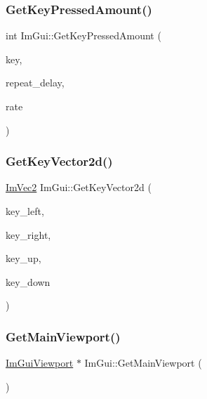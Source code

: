 \subsubsection{\texorpdfstring{Get\+Key\+Pressed\+Amount()}{GetKeyPressedAmount()}}
{\footnotesize\ttfamily int Im\+Gui\+::\+Get\+Key\+Pressed\+Amount (\begin{DoxyParamCaption}\item[{\hyperlink{imgui_8h_aa22ffe36b188427d712447ec465203d4}{Im\+Gui\+Key}}]{key,  }\item[{float}]{repeat\+\_\+delay,  }\item[{float}]{rate }\end{DoxyParamCaption})}

\mbox{\label{namespaceImGui_a521d0ef9e3dbb529c5beaadd06f21829}} 
\subsubsection{\texorpdfstring{Get\+Key\+Vector2d()}{GetKeyVector2d()}}
{\footnotesize\ttfamily \hyperlink{structImVec2}{Im\+Vec2} Im\+Gui\+::\+Get\+Key\+Vector2d (\begin{DoxyParamCaption}\item[{\hyperlink{imgui_8h_aa22ffe36b188427d712447ec465203d4}{Im\+Gui\+Key}}]{key\+\_\+left,  }\item[{\hyperlink{imgui_8h_aa22ffe36b188427d712447ec465203d4}{Im\+Gui\+Key}}]{key\+\_\+right,  }\item[{\hyperlink{imgui_8h_aa22ffe36b188427d712447ec465203d4}{Im\+Gui\+Key}}]{key\+\_\+up,  }\item[{\hyperlink{imgui_8h_aa22ffe36b188427d712447ec465203d4}{Im\+Gui\+Key}}]{key\+\_\+down }\end{DoxyParamCaption})}

\mbox{\label{namespaceImGui_a7bf620af1d66ee7d7b06701894d23e60}} 
\subsubsection{\texorpdfstring{Get\+Main\+Viewport()}{GetMainViewport()}}
{\footnotesize\ttfamily \hyperlink{structImGuiViewport}{Im\+Gui\+Viewport} $\ast$ Im\+Gui\+::\+Get\+Main\+Viewport (\begin{DoxyParamCaption}{ }\end{DoxyParamCaption})}

